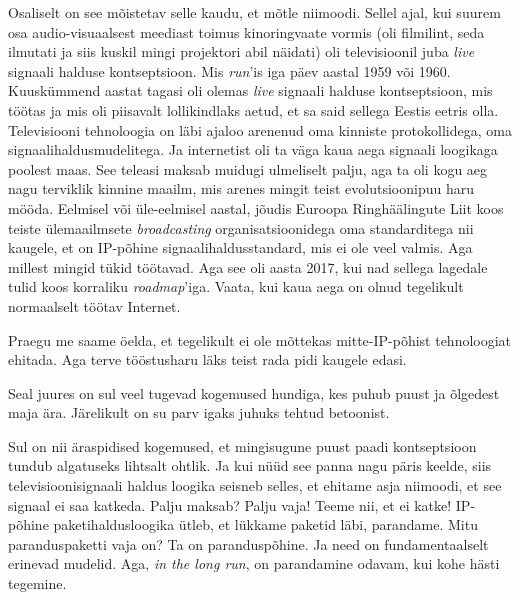 Osaliselt on see mõistetav selle kaudu, et mõtle niimoodi. Sellel ajal, kui 
suurem osa audio-visuaalsest meediast toimus kinoringvaate vormis (oli 
filmilint, seda ilmutati ja siis kuskil mingi projektori abil näidati) oli  
televisioonil juba \emph{live}  signaali halduse kontseptsioon. Mis 
\emph{run}'is  iga päev aastal 1959 või 1960.  Kuuskümmend aastat tagasi oli 
olemas \emph{live} signaali halduse kontseptsioon, mis töötas ja mis oli 
piisavalt lollikindlaks  aetud, et sa said sellega Eestis eetris olla.  
Televisiooni tehnoloogia on läbi ajaloo arenenud oma kinniste protokollidega, 
oma signaalihaldusmudelitega. Ja internetist oli ta väga kaua aega signaali 
loogikaga poolest  maas. See teleasi maksab muidugi ulmeliselt palju, aga 
ta oli kogu aeg nagu terviklik kinnine maailm, mis arenes mingit teist 
evolutsioonipuu haru mööda. Eelmisel või üle-eelmisel aastal,  jõudis Euroopa 
Ringhäälingute Liit koos teiste ülemaailmsete \emph{broadcasting} 
organisatsioonidega  oma standarditega nii kaugele, et on IP-põhine 
signaalihaldusstandard, mis ei ole veel valmis. Aga millest mingid tükid 
töötavad.  Aga see oli aasta 2017, kui nad sellega lagedale tulid koos 
korraliku \emph{roadmap}'iga. Vaata, kui kaua aega on olnud tegelikult 
normaalselt töötav Internet.

Praegu me saame öelda, et tegelikult ei ole mõttekas mitte-IP-põhist 
tehnoloogiat ehitada. Aga  terve tööstusharu läks teist rada pidi  kaugele 
edasi.


Seal juures on sul veel tugevad kogemused hundiga, kes puhub puust ja õlgedest 
maja ära. Järelikult on su parv igaks juhuks tehtud betoonist. 

Sul on nii äraspidised kogemused, et mingisugune puust paadi kontseptsioon 
tundub  algatuseks lihtsalt  ohtlik. Ja kui nüüd see panna nagu päris 
keelde, siis televisioonisignaali haldus loogika seisneb selles, et ehitame 
asja niimoodi, et see signaal ei saa katkeda. Palju maksab? Palju vaja! Teeme 
nii, et ei katke! IP-põhine paketihaldusloogika ütleb, et lükkame paketid läbi, 
parandame. Mitu paranduspaketti vaja on? Ta on paranduspõhine. Ja need on 
fundamentaalselt erinevad mudelid. Aga,  \emph{in the long run}, on parandamine 
odavam, kui kohe hästi tegemine.
